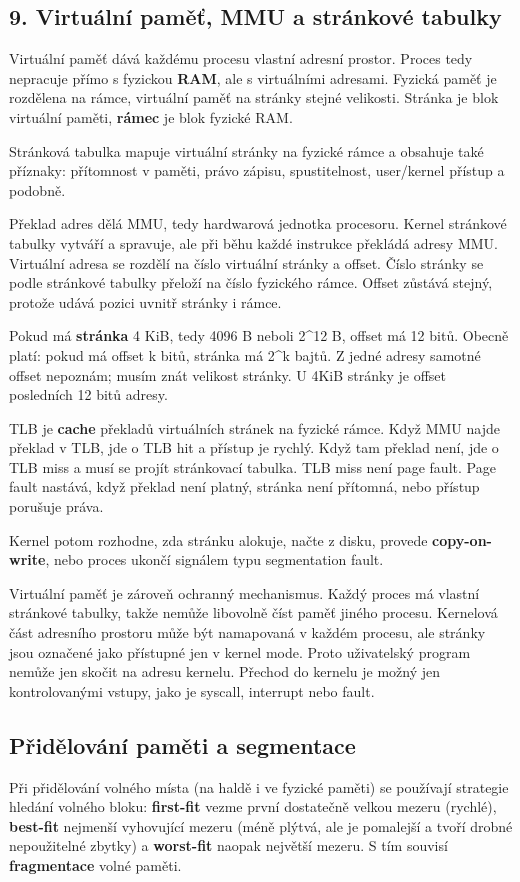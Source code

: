 \documentclass[11pt,a4paper]{article}
\begin{document}
\subsection*{9. Virtuální paměť, MMU a stránkové tabulky}

Virtuální paměť dává každému procesu vlastní adresní prostor. Proces tedy nepracuje přímo s fyzickou \textbf{RAM}, ale s virtuálními adresami. Fyzická paměť je rozdělena na rámce, virtuální paměť na stránky stejné velikosti. Stránka je blok virtuální paměti, \textbf{rámec} je blok fyzické RAM.

Stránková tabulka mapuje virtuální stránky na fyzické rámce a obsahuje také příznaky: přítomnost v paměti, právo zápisu, spustitelnost, user/kernel přístup a podobně.

Překlad adres dělá MMU, tedy hardwarová jednotka procesoru. Kernel stránkové tabulky vytváří a spravuje, ale při běhu každé instrukce překládá adresy MMU. Virtuální adresa se rozdělí na číslo virtuální stránky a offset. Číslo stránky se podle stránkové tabulky přeloží na číslo fyzického rámce. Offset zůstává stejný, protože udává pozici uvnitř stránky i rámce.

Pokud má \textbf{stránka} 4 KiB, tedy 4096 B neboli 2\textasciicircum{}12 B, offset má 12 bitů. Obecně platí: pokud má offset k bitů, stránka má 2\textasciicircum{}k bajtů. Z jedné adresy samotné offset nepoznám; musím znát velikost stránky. U 4KiB stránky je offset posledních 12 bitů adresy.

TLB je \textbf{cache} překladů virtuálních stránek na fyzické rámce. Když MMU najde překlad v TLB, jde o TLB hit a přístup je rychlý. Když tam překlad není, jde o TLB miss a musí se projít stránkovací tabulka. TLB miss není page fault. Page fault nastává, když překlad není platný, stránka není přítomná, nebo přístup porušuje práva.

Kernel potom rozhodne, zda stránku alokuje, načte z disku, provede \textbf{copy-on-write}, nebo proces ukončí signálem typu segmentation fault.

Virtuální paměť je zároveň ochranný mechanismus. Každý proces má vlastní stránkové tabulky, takže nemůže libovolně číst paměť jiného procesu. Kernelová část adresního prostoru může být namapovaná v každém procesu, ale stránky jsou označené jako přístupné jen v kernel mode. Proto uživatelský program nemůže jen skočit na adresu kernelu. Přechod do kernelu je možný jen kontrolovanými vstupy, jako je syscall, interrupt nebo fault.

\subsection*{Přidělování paměti a segmentace}
Při přidělování volného místa (na haldě i ve fyzické paměti) se používají strategie hledání volného bloku: \textbf{first-fit} vezme první dostatečně velkou mezeru (rychlé), \textbf{best-fit} nejmenší vyhovující mezeru (méně plýtvá, ale je pomalejší a tvoří drobné nepoužitelné zbytky) a \textbf{worst-fit} naopak největší mezeru. S tím souvisí \textbf{fragmentace} volné paměti.
\end{document}
